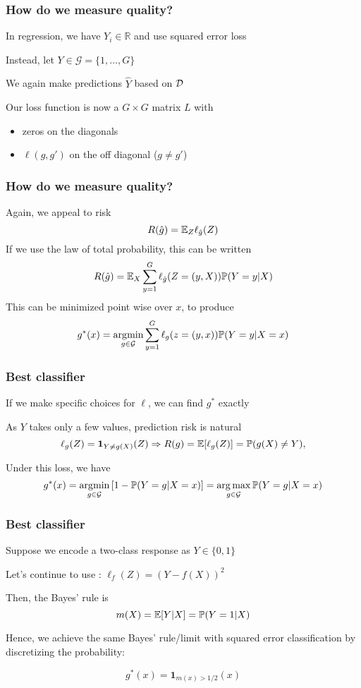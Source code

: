 \documentclass[12pt]{beamer}
\begin{document}
\begin{frame}
\frametitle{How do we measure quality?}
In regression, we have $Y_i \in \mathbb{R}$ and use squared error loss

\vsp
Instead, let $Y \in \mathcal{G} = \{1,\ldots, G\}$ 


\vsp
We again make predictions $\hat{Y}$ based on $\mathcal{D}$

\vsp
Our loss function is now a $G\times G$ matrix $L$ with

\begin{itemize}
\item zeros on the diagonals
\item $\ell(g,g')$ on the off diagonal ($g\neq g'$)
\end{itemize}
\end{frame}

\begin{frame}
\frametitle{How do we measure quality?}
Again, we appeal to risk
\[
R(\hat{g}) = \mathbb{E}_{Z} \ell_{\hat{g}}(Z)
\]
If we use the law of total probability, this can be written
\[
R(\hat{g}) = \mathbb{E}_X \sum_{y=1}^G \ell_{\hat{g}}(Z = (y,X)) \mathbb{P}(Y = y | X)
\]
This can be minimized point wise over $x$, to produce
\[
g^*(x) = \operatorname*{\arg\!\min}_{g \in \mathcal{G}} \sum_{y=1}^G \ell_g(z = (y,x)) \mathbb{P}(Y = y | X=x)
\]
\end{frame}

\begin{frame}
\frametitle{Best classifier}
 If we make specific choices for $\ell$, we can find $g^*$ exactly

\vsp
As $Y$ takes only a few values,  prediction risk is natural
  \[
  \ell_g(Z) = \mathbf{1}_{Y\neq g(X)}(Z) \Rightarrow R(g) = \mathbb{E}[\ell_g(Z)] = \mathbb{P}(g(X) \neq Y),
  \]


\vsp
Under this loss, we have
\[
g^*(x) = \operatorname*{\arg\!\min}_{g \in \mathcal{G}} \left[ 1 - \mathbb{P}(Y = g | X=x)\right]  = \operatorname*{arg\,max}_{g \in \mathcal{G}} \mathbb{P}(Y = g | X = x)
\]


\end{frame}

\begin{frame}
\frametitle{Best classifier}
Suppose we encode a two-class response as $Y \in \{0,1\}$

\vsp
Let's continue to use : $\ell_f(Z) = (Y - f(X))^2$

\vsp
Then, the Bayes' rule is 
\[
m(X) = \mathbb{E}[ Y | X] = \mathbb{P}(Y = 1 | X)
\]

Hence, we achieve the same Bayes' rule/limit with squared error classification
by discretizing the probability:

\[
g^*(x) = \mathbf{1}_{m(x) > 1/2}(x)
\]
\end{frame}
\end{document}
